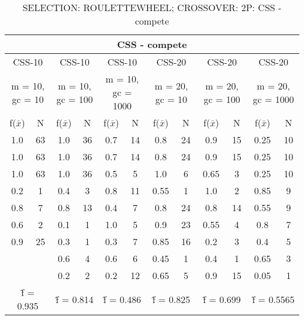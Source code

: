 \begin{table}[H]
	\centering
	\caption{SELECTION: ROULETTEWHEEL; CROSSOVER: 2P: CSS - compete}
	\begin{adjustbox}{width=1\textwidth}
		\begin{tabular}{ |c|c||c|c||c|c||c|c||c|c||c|c| }
			\hline
			\multicolumn{12}{|c|}{CSS - compete} \\
			\hline
			\multicolumn{2}{|c||}{CSS-10} & \multicolumn{2}{c||}{CSS-10} & \multicolumn{2}{c||}{CSS-10} & \multicolumn{2}{c||}{CSS-20} & \multicolumn{2}{c||}{CSS-20} & \multicolumn{2}{c|}{CSS-20}\\
			\hline
			\multicolumn{2}{|c||}{m = 10, gc = 10} & \multicolumn{2}{c||}{m = 10, gc = 100} & \multicolumn{2}{c||}{m = 10, gc = 1000} & \multicolumn{2}{c||}{m = 20, gc = 10} & \multicolumn{2}{c||}{m = 20, gc = 100} & \multicolumn{2}{c|}{m = 20, gc = 1000}\\
			\hline
			f($\bar{x}$) & N & f($\bar{x}$) & N & f($\bar{x}$) & N & f($\bar{x}$) & N & f($\bar{x}$) & N & f($\bar{x}$) & N\\
			\hline
			\hline
			1.0 & 63 & 1.0 & 36 & 0.7 & 14 & 0.8 & 24 & 0.9 & 15 & 0.25 & 10\\
			\hline
			1.0 & 63 & 1.0 & 36 & 0.7 & 14 & 0.8 & 24 & 0.9 & 15 & 0.25 & 10\\
			1.0 & 63 & 1.0 & 36 & 0.5 & 5 & 1.0 & 6 & 0.65 & 3 & 0.25 & 10\\
			0.2 & 1 & 0.4 & 3 & 0.8 & 11 & 0.55 & 1 & 1.0 & 2 & 0.85 & 9\\
			0.8 & 7 & 0.8 & 13 & 0.4 & 7 & 0.8 & 24 & 0.8 & 14 & 0.55 & 9\\
			0.6 & 2 & 0.1 & 1 & 1.0 & 5 & 0.9 & 23 & 0.55 & 4 & 0.8 & 7\\
			0.9 & 25 & 0.3 & 1 & 0.3 & 7 & 0.85 & 16 & 0.2 & 3 & 0.4 & 5\\
			&   & 0.6 & 4 & 0.6 & 6 & 0.45 & 1 & 0.4 & 1 & 0.65 & 3\\
			&   & 0.2 & 2 & 0.2 & 12 & 0.65 & 5 & 0.9 & 15 & 0.05 & 1\\
			\hline
			\multicolumn{2}{|c||}{\^{f} = 0.935} & \multicolumn{2}{c||}{\^{f} = 0.814} & \multicolumn{2}{c||}{\^{f} = 0.486} & \multicolumn{2}{c||}{\^{f} = 0.825} & \multicolumn{2}{c||}{\^{f} = 0.699} & \multicolumn{2}{c|}{\^{f} = 0.5565}\\
			\hline
		\end{tabular}
	\end{adjustbox}
\end{table}

